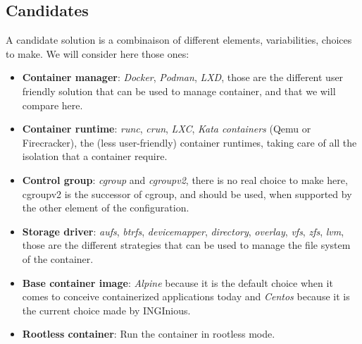 \subsection{Candidates}\label{subs:candidates}
A candidate solution is a combinaison of different elements, variabilities, choices to make.  We will consider here those ones:
\begin{itemize}
  \renewcommand\labelitemi{--}
  \item \textbf{Container manager}: \textit{Docker}, \textit{Podman}, \textit{LXD}, those are the different user friendly solution that can be used to manage container, and that we will compare here.
  \item \textbf{Container runtime}: \textit{runc}, \textit{crun}, \textit{LXC}, \textit{Kata containers} (Qemu or Firecracker), the (less user-friendly) container runtimes, taking care of all the isolation that a container require.
  \item \textbf{Control group}: \textit{cgroup} and \textit{cgroupv2}, there is no real choice to make here, cgroupv2 is the successor of cgroup, and should be used, when supported by the other element of the configuration.
  \item \textbf{Storage driver}: \textit{aufs}, \textit{btrfs}, \textit{devicemapper}, \textit{directory}, \textit{overlay}, \textit{vfs}, \textit{zfs}, \textit{lvm}, those are the different strategies that can be used to manage the file system of the container.
  \item \textbf{Base container image}: \textit{Alpine} because it is the default choice when it comes to conceive containerized applications today and \textit{Centos} because it is the current choice made by INGInious.
  \item \textbf{Rootless container}: Run the container in rootless mode.
\end{itemize}

